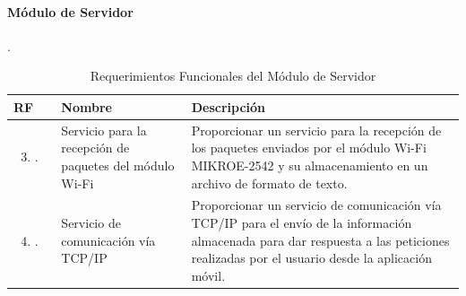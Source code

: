 \paragraph{Módulo de Servidor}.
\begin{longtable}{|M{1.6cm}|M{4.0cm}|M{6.0cm}|}
    \caption{Requerimientos Funcionales del Módulo de Servidor}
	\hline
	\textbf{RF} & \textbf{Nombre} & \textbf{Descripción} \\ 
	\hline
 	\begin{enumerate}[label=RF\arabic*]
 	    \setcounter{enumi}{2}
 	    \item.
 	\end{enumerate}
 	& Servicio para la recepción de paquetes del módulo Wi-Fi
 	& Proporcionar un servicio para la recepción de los paquetes enviados por el módulo Wi-Fi MIKROE-2542 y su almacenamiento en un archivo de formato de texto.\\
    \hline
    \begin{enumerate}[label=RF\arabic*]
        \setcounter{enumi}{3}
 	    \item.
 	\end{enumerate}
 	& Servicio de comunicación vía TCP/IP
 	& Proporcionar un servicio de comunicación vía TCP/IP para el envío de la información almacenada para dar respuesta a las peticiones realizadas por el usuario desde la aplicación móvil. \\
    \hline
\end{longtable}



